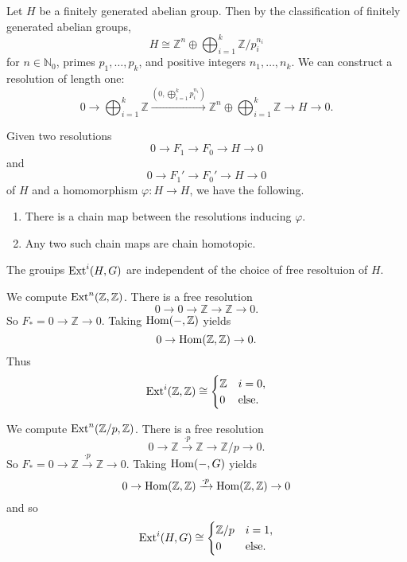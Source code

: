 Let $H$ be a finitely generated abelian group. Then by the classification of finitely generated abelian groups,
\[ H \cong \mathbb Z^n \oplus \bigoplus_{i=1}^k \mathbb Z/p_i^{n_i} \]
for $n \in \mathbb N_0$, primes $p_1, \ldots, p_k$, and positive integers $n_1, \ldots, n_k$. We can construct a resolution of length one:
\[ 0 \to \bigoplus_{i=1}^k \mathbb Z \xrightarrow{(0, \bigoplus_{i=1}^k p_i^{n_i})} \mathbb Z^n \oplus \bigoplus_{i=1}^k \mathbb Z \to H \to 0. \]

\begin{lemma}
    Given two resolutions
    \[ 0 \to F_1 \to F_0 \to H \to 0 \]
    and
    \[ 0 \to F_1' \to F_0' \to H \to 0 \]
    of $H$ and a homomorphism $\varphi: H \to H$, we have the following.
    \begin{enumerate}
        \item There is a chain map between the resolutions inducing $\varphi$.
        \item Any two such chain maps are chain homotopic.
    \end{enumerate}
\end{lemma}

\begin{proposition}
    The grouips $\operatorname{Ext}^i(H, G)$ are independent of the choice of free resoltuion of $H$.
\end{proposition}

\begin{example}
    We compute $\operatorname{Ext}^n(\mathbb Z, \mathbb Z)$. There is a free resolution
    \[ 0 \to 0 \to \mathbb Z \to \mathbb Z \to 0. \]
    So $F_* = 0 \to \mathbb Z \to 0$. Taking $\operatorname{Hom}(-, \mathbb Z)$ yields
    \[ 0 \to \operatorname{Hom}(\mathbb Z, \mathbb Z) \to 0. \]
    Thus
    \[
        \operatorname{Ext}^i(\mathbb Z, \mathbb Z) \cong \begin{cases}
            \mathbb Z & i = 0,       \\
            0         & \text{else}.
        \end{cases}
    \]
\end{example}

\begin{example}
    We compute $\operatorname{Ext}^n(\mathbb Z/p, \mathbb Z)$. There is a free resolution
    \[ 0 \to \mathbb Z \xrightarrow{\cdot p} \mathbb Z \to \mathbb Z/p \to 0. \]
    So $F_* = 0 \to \mathbb Z \xrightarrow{\cdot p} \mathbb Z \to 0$. Taking $\operatorname{Hom}(-, G)$ yields
    \[ 0 \to \operatorname{Hom}(\mathbb Z, \mathbb Z) \xrightarrow{\cdot p} \operatorname{Hom}(\mathbb Z, \mathbb Z) \to 0 \]
    and so
    \[
        \operatorname{Ext}^i(H, G) \cong \begin{cases}
            \mathbb Z/p & i = 1,       \\
            0           & \text{else}.
        \end{cases}
    \]
\end{example}

